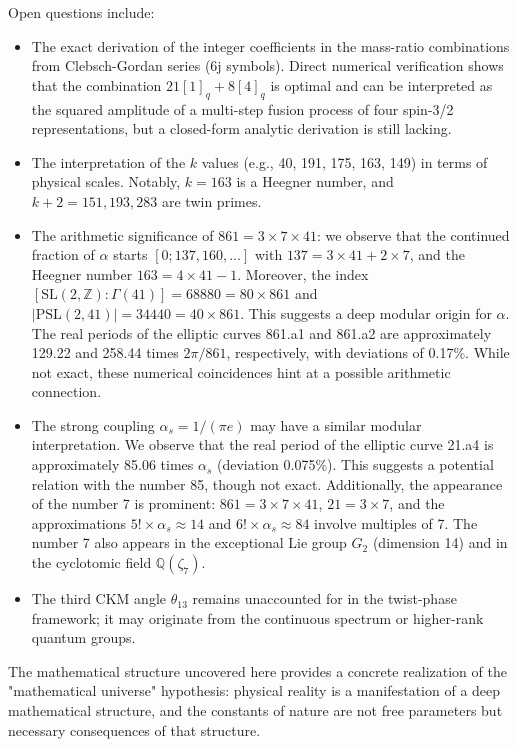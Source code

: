 ﻿\documentclass[twocolumn]{article}
\begin{document}
Open questions include:
\begin{itemize}
\item The exact derivation of the integer coefficients in the mass-ratio combinations from Clebsch-Gordan series (6j symbols). Direct numerical verification shows that the combination \(21[1]_q+8[4]_q\) is optimal and can be interpreted as the squared amplitude of a multi-step fusion process of four spin-3/2 representations, but a closed-form analytic derivation is still lacking.
\item The interpretation of the \(k\) values (e.g., 40, 191, 175, 163, 149) in terms of physical scales. Notably, \(k=163\) is a Heegner number, and \(k+2=151,193,283\) are twin primes.
\item The arithmetic significance of \(861 = 3\times 7\times 41\): we observe that the continued fraction of \(\alpha\) starts \([0;137,160,\dots]\) with \(137 = 3\times 41 + 2\times 7\), and the Heegner number \(163 = 4\times 41 - 1\). Moreover, the index \([\mathrm{SL}(2,\mathbb{Z}):\Gamma(41)] = 68880 = 80\times 861\) and \(|\mathrm{PSL}(2,41)| = 34440 = 40\times 861\). This suggests a deep modular origin for \(\alpha\). The real periods of the elliptic curves 861.a1 and 861.a2 are approximately 129.22 and 258.44 times \(2\pi/861\), respectively, with deviations of 0.17\%. While not exact, these numerical coincidences hint at a possible arithmetic connection.
\item The strong coupling \(\alpha_s = 1/(\pi e)\) may have a similar modular interpretation. We observe that the real period of the elliptic curve 21.a4 is approximately 85.06 times \(\alpha_s\) (deviation 0.075\%). This suggests a potential relation with the number 85, though not exact. Additionally, the appearance of the number 7 is prominent: \(861=3\times7\times41\), \(21=3\times7\), and the approximations \(5!\times\alpha_s\approx14\) and \(6!\times\alpha_s\approx84\) involve multiples of 7. The number 7 also appears in the exceptional Lie group \(G_2\) (dimension 14) and in the cyclotomic field \(\mathbb{Q}(\zeta_7)\).
\item The third CKM angle \(\theta_{13}\) remains unaccounted for in the twist-phase framework; it may originate from the continuous spectrum or higher-rank quantum groups.
\end{itemize}

The mathematical structure uncovered here provides a concrete realization of the "mathematical universe" hypothesis: physical reality is a manifestation of a deep mathematical structure, and the constants of nature are not free parameters but necessary consequences of that structure.
\end{document}
